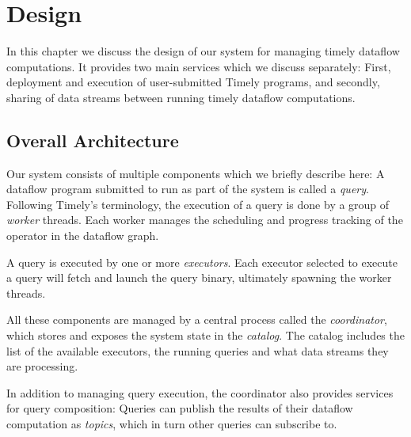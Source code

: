 \chapter{Design}\label{ch:design}

In this chapter we discuss the design of our system for managing timely dataflow
computations. It provides two main services which we discuss separately:
First, deployment and execution of user-submitted Timely programs, and secondly,
sharing of data streams between running timely dataflow computations.

\section{Overall Architecture}

Our system consists of multiple components which we briefly describe here:
A dataflow program submitted to run as part of the system is
called a \emph{query}. Following Timely's terminology, the execution of a query
is done by a group of \emph{worker} threads. Each worker manages the scheduling and
progress tracking of the operator in the dataflow graph. 

A query is executed by one or more \emph{executors}. Each executor selected to
execute a query will fetch and launch the query binary, ultimately spawning the
worker threads.

All these components are managed by a central process called the \emph{coordinator},
which stores and exposes the system state in the \emph{catalog}. The catalog includes
the list of the available executors, the running queries and what data streams they
are processing.

In addition to managing query execution, the coordinator also provides services
for query composition: Queries can publish the results of their dataflow
computation as \emph{topics}, which in turn other queries can subscribe to.


